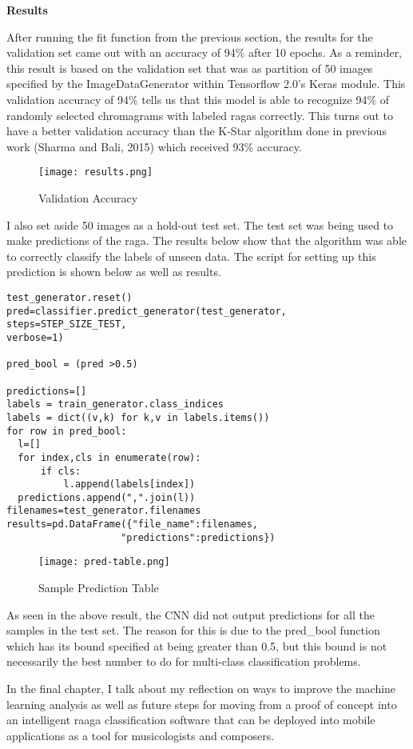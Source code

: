 \doublespacing
\setlength{\parindent}{1cm}

\begin{flushleft}
  \textbf{Results}
\end{flushleft}

After running the fit function from the previous section, the results for the validation set came out with an accuracy of 94\% after 10 epochs. As a reminder, this result is based on the validation set that was as partition of 50 images specified by the ImageDataGenerator within Tensorflow 2.0's Keras module. This validation accuracy of 94\% tells us that this model is able to recognize 94\% of randomly selected chromagrams with labeled ragas correctly. This turns out to have a better validation accuracy than the K-Star algorithm done in previous work (Sharma and Bali, 2015) which received 93\% accuracy.

\begin{figure}
  \caption{Validation Accuracy}
  \texttt{[image: results.png]}
\end{figure}

I also set aside 50 images as a hold-out test set. The test set was being used to make predictions of the raga. The results below show that the algorithm was able to correctly classify the labels of unseen data. The script for setting up this prediction is shown below as well as results.

\begin{lstlisting}
test_generator.reset()
pred=classifier.predict_generator(test_generator,
steps=STEP_SIZE_TEST,
verbose=1)

pred_bool = (pred >0.5)

predictions=[]
labels = train_generator.class_indices
labels = dict((v,k) for k,v in labels.items())
for row in pred_bool:
  l=[]
  for index,cls in enumerate(row):
      if cls:
          l.append(labels[index])
  predictions.append(",".join(l))
filenames=test_generator.filenames
results=pd.DataFrame({"file_name":filenames,
                    "predictions":predictions})
\end{lstlisting}

\begin{figure}
  \caption{Sample Prediction Table}
  \texttt{[image: pred-table.png]}
\end{figure}

As seen in the above result, the CNN did not output predictions for all the samples in the test set. The reason for this is due to the pred\_bool function which has its bound specified at being greater than 0.5, but this bound is not necessarily the best number to do for multi-class classification problems.
\par
In the final chapter, I talk about my reflection on ways to improve the machine learning analysis as well as future steps for moving from a proof of concept into an intelligent raaga classification software that can be deployed into mobile applications as a tool for musicologists and composers. 
